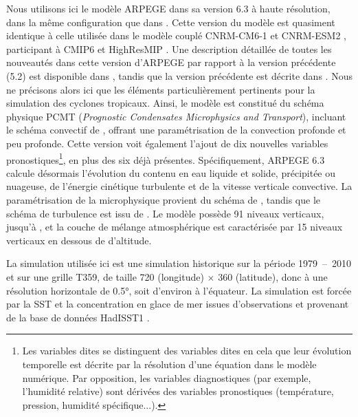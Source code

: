 \documentclass[../main.tex]{subfiles}
\begin{document}
Nous utilisons ici le modèle ARPEGE dans sa version 6.3 à haute résolution, dans la même configuration que dans
\textcite{chauvin_future_2020,cattiaux_projected_2020}. Cette version du modèle est quasiment identique à celle utilisée dans le modèle couplé CNRM-CM6-1
\parencite{voldoire_evaluation_2019} et CNRM-ESM2 \parencite{seferian_evaluation_2019}, participant à CMIP6 \parencite{eyring_overview_2016} et HighResMIP
\parencite{haarsma_highresmip_2020}. Une description détaillée de toutes les nouveautés dans cette version d'ARPEGE par rapport à la version précédente (5.2)
est disponible dans \textcite{voldoire_evaluation_2019}, tandis que la version précédente est décrite dans \textcite{voldoire_cnrmcm5_2013}. Nous ne précisons
alors ici que les éléments particulièrement pertinents pour la simulation des cyclones tropicaux. Ainsi, le modèle est constitué du schéma physique PCMT
(\textit{Prognostic Condensates Microphysics and Transport}), incluant le schéma convectif de \textcite{piriou_approach_2007,gueremy_continuous_2011}, offrant
une paramétrisation de la convection profonde et peu profonde. Cette version voit également l'ajout de dix nouvelles variables pronostiques\footnote{Les
variables dites  se distinguent des variables dites  en cela que leur évolution temporelle est décrite par la
résolution d'une équation dans le modèle numérique. Par opposition, les variables diagnostiques (par exemple, l'humidité relative) sont dérivées des variables
pronostiques (température, pression, humidité spécifique...).}, en plus des six déjà présentes. Spécifiquement, ARPEGE 6.3 calcule désormais l'évolution du
contenu en eau liquide et solide, précipitée ou nuageuse, de l'énergie cinétique turbulente et de la vitesse verticale convective. La paramétrisation de la
microphysique provient du schéma de \textcite{lopez_implementation_2002}, tandis que le schéma de turbulence est issu de \textcite{cuxart_turbulence_2000}. Le
modèle possède \num{91} niveaux verticaux, jusqu'à , et la couche de mélange atmosphérique est caractérisée par \num{15} niveaux verticaux en dessous
de  d'altitude.

La simulation utilisée ici est une simulation historique sur la période \num{1979}~--~\num{2010} et sur une grille T359, de taille \num{720} (longitude)
$\times$ \num{360} (latitude), donc à une résolution horizontale de \ang{0.5}, soit d'environ  à l'équateur. La simulation est forcée par la SST et la concentration
en glace de mer issues d'observations et provenant de la base de données HadISST1 \parencite{rayner_global_2003}.
\end{document}
